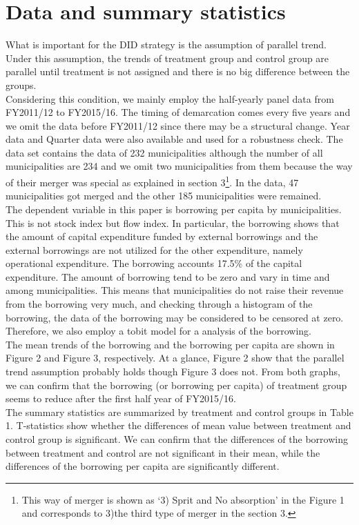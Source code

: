 \documentclass[dvipdfmx]{jsarticle}
\begin{document}
\section{Data and summary statistics}
What is important for the DID strategy is the assumption of parallel trend. Under this assumption, the trends of treatment group and control group are parallel until treatment is not assigned and there is no big difference between the groups.\\
\quad Considering this condition, we mainly employ the half-yearly panel data from FY2011/12 to FY2015/16. The timing of demarcation comes every five years and we omit the data before FY2011/12 since there may be a structural change. Year data and Quarter data were also available and used for a robustness check. The data set contains the data of 232 municipalities although the number of all municipalities are 234 and we omit two municipalities from them because the way of their merger was special as explained in section 3\footnote{This way of merger is shown as `3) Sprit and No absorption' in the Figure 1 and corresponds to 3)the third type of merger in the section 3.}. In the data, 47 municipalities got merged and the other 185 municipalities were remained.\\
\quad The dependent variable in this paper is borrowing per capita by municipalities. This is not stock index but flow index. In particular, the borrowing shows that the amount of capital expenditure funded by external borrowings and the external borrowings are not utilized for the other expenditure, namely operational expenditure.  The borrowing accounts 17.5\% of the capital expenditure. The amount of borrowing tend to be zero and vary in time and among municipalities. This means that municipalities do not raise their revenue from the borrowing very much, and checking through a histogram of the borrowing, the data of the borrowing may be considered to be censored at zero. Therefore, we also employ a tobit model for a analysis of the borrowing.\\
\quad The mean trends of the borrowing and the borrowing per capita are shown in Figure 2 and Figure 3, respectively. At a glance, Figure 2 show that the parallel trend assumption probably holds though Figure 3 does not. From both graphs, we can confirm that the borrowing (or borrowing per capita) of treatment group seems to reduce after the first half year of FY2015/16.\\
\quad The summary statistics are summarized by treatment and control groups in Table 1. T-statistics show whether the differences of mean value between treatment and control group is significant. We can confirm that the differences of the borrowing between treatment and control are not significant in their mean, while the differences of the borrowing per capita are significantly different.\\
\end{document}
